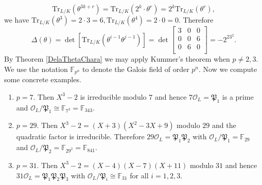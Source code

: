 $$
\mathrm{Tr}_{L/K}\left( \theta ^{3k+r} \right) =\mathrm{Tr}_{L/K}\left( 2^k\cdot \theta ^r \right) =2^k\mathrm{Tr}_{L/K}\left( \theta ^r \right) ,
$$
we have $\mathrm{Tr}_{L/K}\left( \theta ^3 \right) =2\cdot 3=6,\mathrm{Tr}_{L/K}\left( \theta ^4 \right) =2\cdot 0=0$. Therefore 
$$
\Delta \left( \theta \right) =\det \left[ \mathrm{Tr}_{L/K}\left( \theta ^{i-1}\theta ^{j-1} \right) \right] =\det \left[ \begin{matrix}
	3&		0&		0\\
	0&		0&		6\\
	0&		6&		0\\
\end{matrix} \right] =-2^23^2.
$$
By Theorem \ref{DelaThetaChara} we may apply Kummer's theorem when $p\ne 2,3$. We use the notation $\mathbb{F}_{p^n}$ to denote the Galois field of order $p^n$. Now we compute some concrete examples.
\begin{enumerate}
    \item $p=7$. Then $X^3-2$ is irreducible modulo $7$ and hence $7\mathcal{O}_L=\mathfrak{P}_1$ is a prime and $\mathcal{O}_L/\mathfrak{P}_1\cong\mathbb{F}_{7^3}=\mathbb{F}_{343}$.
    \item $p=29$. Then $X^3-2=(X+3)(X^2-3X+9)$ modulo $29$ and the quadratic factor is irreducible. Therefore $29\mathcal{O}_L=\mathfrak{P}_1\mathfrak{P}_2$ with $\mathcal{O}_L/\mathfrak{P}_1=\mathbb{F}_{29}$ and $\mathcal{O}_L/\mathfrak{P}_2=\mathbb{F}_{29^2}=\mathbb{F}_{841}$.
    \item $p=31$. Then $X^3-2=(X-4)(X-7)(X+11)$ modulo $31$ and hence $31\mathcal{O}_L=\mathfrak{P}_1\mathfrak{P}_2\mathfrak{P}_3$ with $\mathcal{O}_L/\mathfrak{P}_i\cong\mathbb{F}_{31}$ for all $i=1,2,3$.
\end{enumerate}

